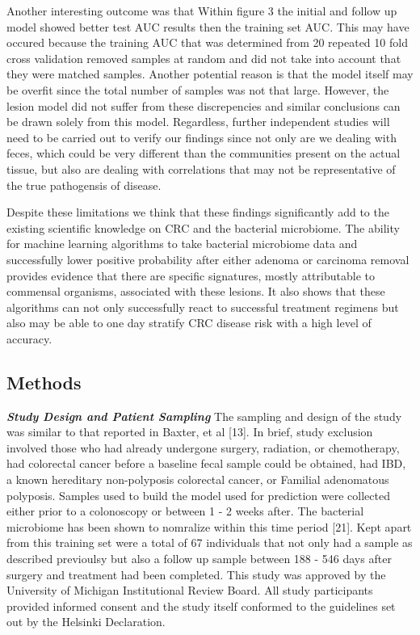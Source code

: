 \documentclass[12pt,]{article}
\begin{document}
Another interesting outcome was that Within figure 3 the initial and
follow up model showed better test AUC results then the training set
AUC. This may have occured because the training AUC that was determined
from 20 repeated 10 fold cross validation removed samples at random and
did not take into account that they were matched samples. Another
potential reason is that the model itself may be overfit since the total
number of samples was not that large. However, the lesion model did not
suffer from these discrepencies and similar conclusions can be drawn
solely from this model. Regardless, further independent studies will
need to be carried out to verify our findings since not only are we
dealing with feces, which could be very different than the communities
present on the actual tissue, but also are dealing with correlations
that may not be representative of the true pathogensis of disease.

Despite these limitations we think that these findings significantly add
to the existing scientific knowledge on CRC and the bacterial
microbiome. The ability for machine learning algorithms to take
bacterial microbiome data and successfully lower positive probability
after either adenoma or carcinoma removal provides evidence that there
are specific signatures, mostly attributable to commensal organisms,
associated with these lesions. It also shows that these algorithms can
not only successfully react to successful treatment regimens but also
may be able to one day stratify CRC disease risk with a high level of
accuracy.

\newpage

\subsection{Methods}\label{methods}

\textbf{\emph{Study Design and Patient Sampling}} The sampling and
design of the study was similar to that reported in Baxter, et al
{[}13{]}. In brief, study exclusion involved those who had already
undergone surgery, radiation, or chemotherapy, had colorectal cancer
before a baseline fecal sample could be obtained, had IBD, a known
hereditary non-polyposis colorectal cancer, or Familial adenomatous
polyposis. Samples used to build the model used for prediction were
collected either prior to a colonoscopy or between 1 - 2 weeks after.
The bacterial microbiome has been shown to nomralize within this time
period {[}21{]}. Kept apart from this training set were a total of 67
individuals that not only had a sample as described previoulsy but also
a follow up sample between 188 - 546 days after surgery and treatment
had been completed. This study was approved by the University of
Michigan Institutional Review Board. All study participants provided
informed consent and the study itself conformed to the guidelines set
out by the Helsinki Declaration.
\end{document}
